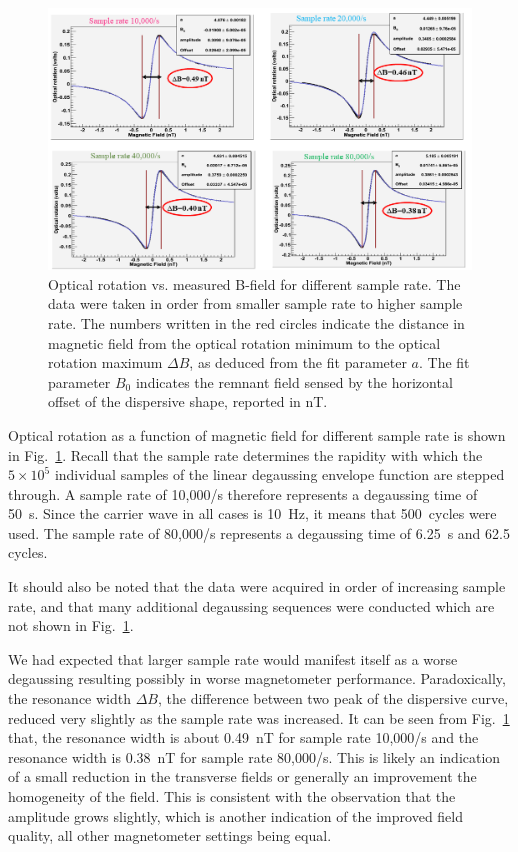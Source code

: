 \begin{figure}%
  \centering\includegraphics[width=\linewidth]{figures/sample_rate}
  \caption{ Optical rotation vs. measured B-field for different sample
    rate.  The data were taken in order from smaller sample rate to
    higher sample rate.  The numbers written in the red circles
    indicate the distance in magnetic field from the optical rotation
    minimum to the optical rotation maximum $\Delta B$, as deduced
    from the fit parameter $a$.  The fit parameter $B_0$ indicates the
    remnant field sensed by the horizontal offset of the dispersive
    shape, reported in nT.\label{fig:different-sample-rate}}
\end{figure}

Optical rotation as a function of magnetic field for different sample
rate is shown in Fig.~\ref{fig:different-sample-rate}.  Recall that
the sample rate determines the rapidity with which the $5\times 10^5$
individual samples of the linear degaussing envelope function are
stepped through.  A sample rate of 10,000/s therefore represents a
degaussing time of 50~s.  Since the carrier wave in all cases is
10~Hz, it means that 500~cycles were used.  The sample rate of
80,000/s represents a degaussing time of 6.25~s and 62.5 cycles.

It should also be noted that the data were acquired in order of
increasing sample rate, and that many additional degaussing sequences
were conducted which are not shown in
Fig.~\ref{fig:different-sample-rate}.

We had expected that larger sample rate would manifest itself as a
worse degaussing resulting possibly in worse magnetometer performance.
Paradoxically, the resonance width $\Delta B$, the difference between
two peak of the dispersive curve, reduced very slightly as the sample
rate was increased.  It can be seen from
Fig.~\ref{fig:different-sample-rate} that, the resonance width is
about 0.49~nT for sample rate 10,000/s and the resonance width is
0.38~nT for sample rate 80,000/s.  This is likely an indication of a
small reduction in the transverse fields or generally an improvement
the homogeneity of the field.  This is consistent with the observation
that the amplitude grows slightly, which is another indication of the
improved field quality, all other magnetometer settings being equal.

